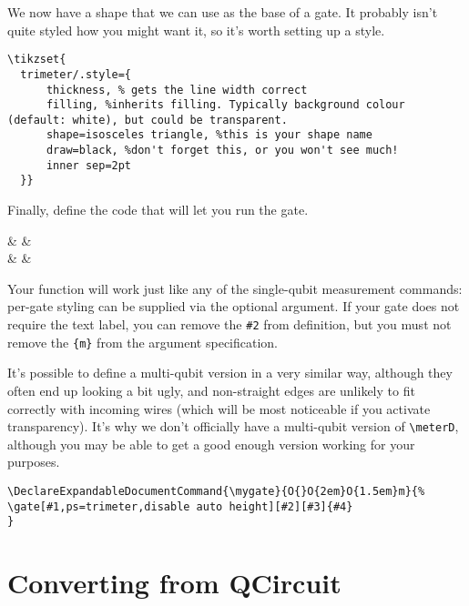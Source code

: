 \documentclass[aps,pra,10pt,nofootinbib]{revtex4-2}
\begin{document}
We now have a shape that we can use as the base of a gate. It probably isn't quite styled how you might want it, so it's worth setting up a style.

\begin{FullCode}
  \begin{lstlisting}
\tikzset{
  trimeter/.style={
      thickness, % gets the line width correct
      filling, %inherits filling. Typically background colour (default: white), but could be transparent.
      shape=isosceles triangle, %this is your shape name
      draw=black, %don't forget this, or you won't see much!
      inner sep=2pt
  }}
\end{lstlisting}
\end{FullCode}

Finally, define the code that will let you run the gate.
\begin{Code}

  \begin{quantikz}[classical gap=0.05cm]
     &  &  \\
    & &
  \end{quantikz}
\end{Code}
Your function will work just like any of the single-qubit measurement commands: per-gate styling can be supplied via the optional argument. If your gate does not require the text label, you can remove the \texttt{\#2} from definition, but you must not remove the \texttt{\{m\}} from the argument specification.

It's possible to define a multi-qubit version in a very similar way, although they often end up looking a bit ugly, and non-straight edges are unlikely to fit correctly with incoming wires (which will be most noticeable if you activate transparency). It's why we don't officially have a multi-qubit version of \verb!\meterD!, although you may be able to get a good enough version working for your purposes.

\begin{FullCode}
  \begin{lstlisting}
\DeclareExpandableDocumentCommand{\mygate}{O{}O{2em}O{1.5em}m}{%
\gate[#1,ps=trimeter,disable auto height][#2][#3]{#4}
}
\end{lstlisting}
\end{FullCode}


\section{Converting from QCircuit}
\end{document}
